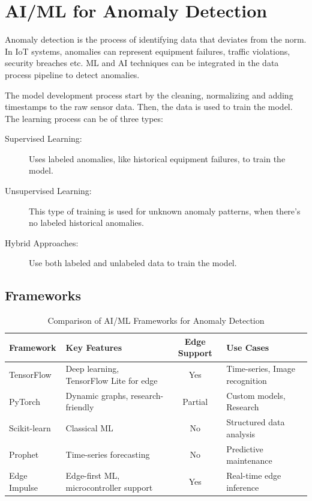 \section{AI/ML for Anomaly Detection}
Anomaly detection is the process of identifying data that deviates from the norm.
In \gls{IoT} systems, anomalies can represent equipment failures, traffic violations,
security breaches etc. \gls{ML} and \gls{AI} techniques
can be integrated in the data process pipeline to detect anomalies.

The model development process start by the cleaning, normalizing and adding
timestamps to the raw sensor data. Then, the data is used to train the model.
The learning process can be of three types:

\begin{description}
	\item[Supervised Learning: ] Uses labeled anomalies, like historical equipment
	      failures, to train the model.


	\item[Unsupervised Learning: ] This type of training is used for unknown
	      anomaly patterns, when there's no labeled historical anomalies.


	\item[Hybrid Approaches: ] Use both labeled and unlabeled data to train the
	      model.
\end{description}

\subsection{Frameworks}
\begin{table}[ht]
	\centering
	\caption{Comparison of \gls{AI}/\gls{ML} Frameworks for Anomaly Detection}
	\label{tab:ai-ml:frameworks}
	\begin{tabular}{p{2cm}p{4cm}cp{3cm}}
		\toprule
		\textbf{Framework} & \textbf{Key Features}                        & \textbf{Edge Support} & \textbf{Use Cases}             \\
		\midrule
		TensorFlow         & Deep learning, TensorFlow Lite for edge      & Yes                   & Time-series, Image recognition \\
		PyTorch            & Dynamic graphs, research-friendly            & Partial               & Custom models, Research        \\
		Scikit-learn       & Classical \gls{ML}                           & No                    & Structured data analysis       \\
		Prophet            & Time-series forecasting                      & No                    & Predictive maintenance         \\
		Edge Impulse       & Edge-first \gls{ML}, microcontroller support & Yes                   & Real-time edge inference       \\
		\bottomrule
	\end{tabular}
\end{table}

